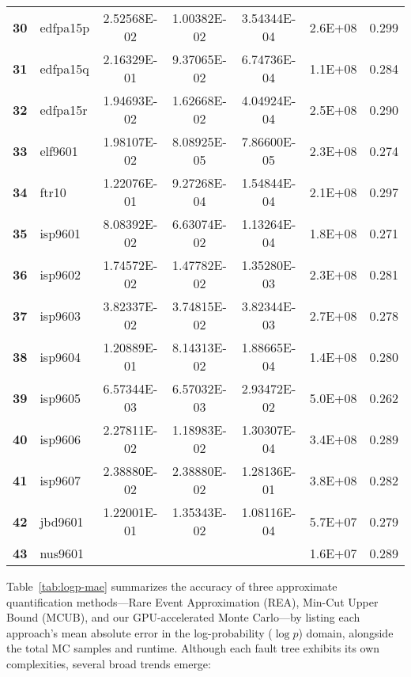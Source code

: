 \begin{longtable}{@{}llS[table-format=1.2e-2]S[table-format=1.2e-2]S[table-format=1.2e-2]ll@{}}
\textbf{30} & edfpa15p & 2.52568E-02 & 1.00382E-02 & 3.54344E-04 & 2.6E+08 & 0.299 \\
\textbf{31} & edfpa15q & 2.16329E-01 & 9.37065E-02 & 6.74736E-04 & 1.1E+08 & 0.284 \\
\textbf{32} & edfpa15r & 1.94693E-02 & 1.62668E-02 & 4.04924E-04 & 2.5E+08 & 0.290 \\
\textbf{33} & elf9601  & 1.98107E-02 & 8.08925E-05 & 7.86600E-05 & 2.3E+08 & 0.274 \\
\textbf{34} & ftr10    & 1.22076E-01 & 9.27268E-04 & 1.54844E-04 & 2.1E+08 & 0.297 \\
\textbf{35} & isp9601  & 8.08392E-02 & 6.63074E-02 & 1.13264E-04 & 1.8E+08 & 0.271 \\
\textbf{36} & isp9602  & 1.74572E-02 & 1.47782E-02 & 1.35280E-03 & 2.3E+08 & 0.281 \\
\textbf{37} & isp9603  & 3.82337E-02 & 3.74815E-02 & 3.82344E-03 & 2.7E+08 & 0.278 \\
\textbf{38} & isp9604  & 1.20889E-01 & 8.14313E-02 & 1.88665E-04 & 1.4E+08 & 0.280 \\
\textbf{39} & isp9605  & 6.57344E-03 & 6.57032E-03 & 2.93472E-02                         & 5.0E+08 & 0.262 \\
\textbf{40} & isp9606  & 2.27811E-02 & 1.18983E-02 & 1.30307E-04 & 3.4E+08 & 0.289 \\
\textbf{41} & isp9607  & 2.38880E-02 & 2.38880E-02 & 1.28136E-01                         & 3.8E+08 & 0.282 \\
\textbf{42} & jbd9601  & 1.22001E-01 & 1.35343E-02 & 1.08116E-04 & 5.7E+07 & 0.279 \\
\textbf{43} & nus9601  &            &            &                                    & 1.6E+07 & 0.289 \\* \bottomrule
\end{longtable}

Table~\ref{tab:logp-mae} summarizes the accuracy of three approximate quantification methods—Rare Event Approximation (REA), Min-Cut Upper Bound (MCUB), and our GPU-accelerated Monte Carlo—by listing each approach's mean absolute error in the log-probability (\(\log p\)) domain, alongside the total MC samples and runtime. Although each fault tree exhibits its own complexities, several broad trends emerge:

